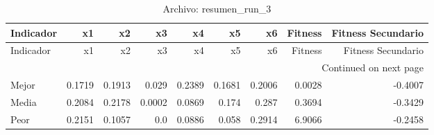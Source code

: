 \begin{longtable}{lrrrrrrrr}
\caption{Archivo: resumen\_run\_3}\label{tab:resumen_run_3} \\
\toprule
Indicador & x1 & x2 & x3 & x4 & x5 & x6 & Fitness & Fitness Secundario \\
\midrule
\endfirsthead
\toprule
Indicador & x1 & x2 & x3 & x4 & x5 & x6 & Fitness & Fitness Secundario \\
\midrule
\endhead
\midrule
\multicolumn{9}{r}{Continued on next page} \\
\midrule
\endfoot
\bottomrule
\endlastfoot
Mejor & 0.1719 & 0.1913 & 0.029 & 0.2389 & 0.1681 & 0.2006 & 0.0028 & -0.4007 \\
Media & 0.2084 & 0.2178 & 0.0002 & 0.0869 & 0.174 & 0.287 & 0.3694 & -0.3429 \\
Peor & 0.2151 & 0.1057 & 0.0 & 0.0886 & 0.058 & 0.2914 & 6.9066 & -0.2458 \\
\end{longtable}
